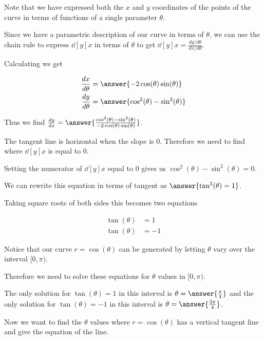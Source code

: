 \documentclass{ximera}
\begin{document}
\begin{exercise}
\begin{hint}
Note that we have expressed both the $x$ and $y$ coordinates of the points of the curve in terms of functions of a single parameter $\theta$.

Since we have a parametric description of our curve in terms of $\theta$, 
we can use the chain rule to express $\dd[y]{x}$ in terms of $\theta$ to get $\dd[y]{x}=\frac{ dy/d\theta}{dx/d\theta}$.

Calculating we get

\begin{align*}
\dd[x]{\theta}&=\answer{ -2\cos(\theta)\sin(\theta)  } \\
\dd[y]{\theta}&=\answer{ \cos^2(\theta)-\sin^2(\theta)    }
\end{align*} 

Thus we find $\dd[y]{x}=\answer{ \frac{ \cos^2(\theta)-\sin^2(\theta)}{-2\cos(\theta)\sin(\theta)}}$. 

The tangent line is horizontal when the slope is $0$. Therefore we need to find where $\dd[y]{x}$ is equal to $0$.

Setting the numerator of $\dd[y]{x}$ equal to $0$ gives us $\cos^2(\theta)-\sin^2(\theta)=0$. 

We can rewrite this equation in terms of tangent as $\answer{ \tan^2(\theta)=1 }$. 

Taking square roots of both sides this becomes two equations

\begin{align*}
 \tan(\theta)&=1 \\
\tan(\theta)&=-1
\end{align*}

Notice that our curve $r=\cos(\theta)$ can be generated by letting $\theta$ vary over the interval $[0, \pi)$. 

Therefore we need to solve these equations for $\theta$ values in  $[0, \pi)$. 

The only solution for $\tan(\theta)=1$ in this interval is $\theta=\answer{\frac{\pi}{4}}$ and the only solution 
for $\tan(\theta)=-1$ in this interval is $\theta=\answer{\frac{3\pi}{4}}$. 



\end{hint}

\begin{exercise}



Now we want to find the $\theta$ values where $r=\cos(\theta)$ has a vertical tangent line and give the equation of the line. 


\end{exercise}
\end{exercise}
\end{document}
